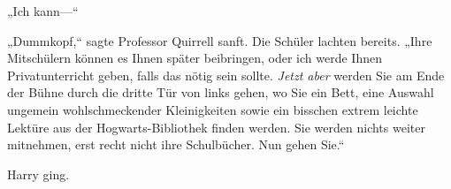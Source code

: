 „Ich kann—“

„Dummkopf,“ sagte Professor Quirrell sanft. Die Schüler lachten bereits. „Ihre Mitschülern können es Ihnen später beibringen, oder ich werde Ihnen Privatunterricht geben, falls das nötig sein sollte. \emph{Jetzt aber} werden Sie am Ende der Bühne durch die dritte Tür von links gehen, wo Sie ein Bett, eine Auswahl ungemein wohlschmeckender Kleinigkeiten sowie ein bisschen extrem leichte Lektüre aus der Hogwarts-Bibliothek finden werden. Sie werden nichts weiter mitnehmen, erst recht nicht ihre Schulbücher. Nun gehen Sie.“

Harry ging.


